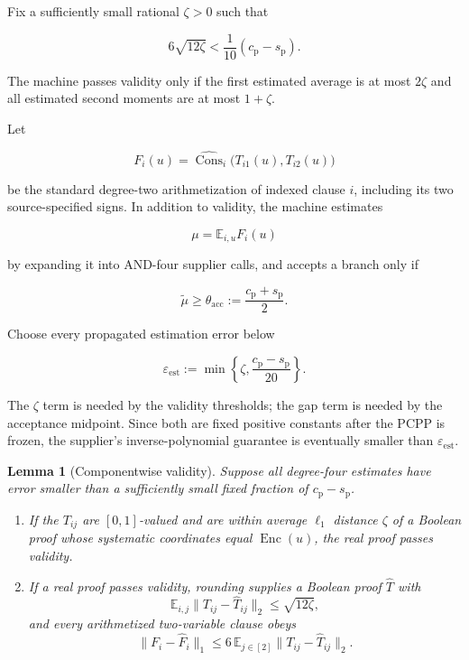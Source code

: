 \documentclass[11pt,letterpaper]{article}
\newtheorem{lemma}[theorem]{Lemma}
\theoremstyle{definition}
\theoremstyle{remark}
\begin{document}
Fix a sufficiently small rational \(\zeta>0\) such that

\[
6\sqrt{12\zeta}
{}<{}
\frac1{10}(c_{\mathrm p}-s_{\mathrm p}).
\]

The machine passes validity only if the first estimated average is at
most \(2\zeta\) and all estimated second moments are at most
\(1+\zeta\).

Let

\[
F_i(u)
{}={}
\widehat{\operatorname{Cons}}_i
\bigl(T_{i1}(u),T_{i2}(u)\bigr)
\]

be the standard degree-two arithmetization of indexed clause \(i\),
including its two source-specified signs. In addition to validity, the
machine estimates

\[
\mu
{}={}
\mathbb E_{i,u}F_i(u)
\]

by expanding it into AND-four supplier calls, and accepts a branch only
if

\[
\widetilde\mu
\ge
\theta_{\mathrm{acc}}
:=
\frac{c_{\mathrm p}+s_{\mathrm p}}2.
\tag{C.10.1}
\]

Choose every propagated estimation error below

\[
\varepsilon_{\mathrm{est}}
:=
\min\left\{\zeta,\frac{c_{\mathrm p}-s_{\mathrm p}}{20}\right\}.
\tag{C.10.2}
\]

The \(\zeta\) term is needed by the validity thresholds; the gap term is
needed by the acceptance midpoint. Since both are fixed positive
constants after the PCPP is frozen, the supplier's
inverse-polynomial guarantee is eventually smaller than
\(\varepsilon_{\mathrm{est}}\).

\begin{lemma}[Componentwise validity]
\label{lem:componentwise-validity}
Suppose all
degree-four estimates have error smaller than a sufficiently small fixed
fraction of \(c_{\mathrm p}-s_{\mathrm p}\).

\begin{enumerate}
\def\labelenumi{\arabic{enumi}.}
\item
  If the \(T_{ij}\) are \([0,1]\)-valued and are within average
  \(\ell_1\) distance \(\zeta\) of a Boolean proof whose systematic
  coordinates equal \(\operatorname{Enc}(u)\), the real proof passes
  validity.
\item
  If a real proof passes validity, rounding supplies a Boolean proof
  \(\widehat T\) with \[
  \mathbb E_{i,j}\lVert T_{ij}-\widehat T_{ij}\rVert_2
  \le
  \sqrt{12\zeta},
  \] and every arithmetized two-variable clause obeys \[
  \lVert F_i-\widehat F_i\rVert_1
  \le
  6\,
  \mathbb E_{j\in[2]}
  \lVert T_{ij}-\widehat T_{ij}\rVert_2.
  \]
\end{enumerate}
\end{lemma}
\end{document}
